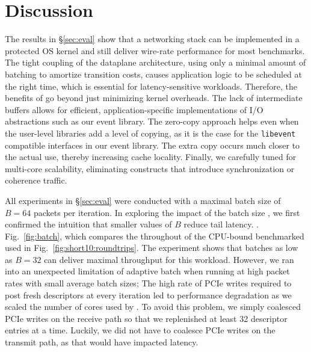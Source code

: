 
\section{Discussion}
\label{sec:disc}


 The results in \S\ref{sec:eval}
show that a networking stack can be implemented in a protected OS
kernel and still deliver wire-rate performance for most benchmarks.
The tight coupling of the dataplane architecture, using only a minimal
amount of batching to amortize transition costs, causes application
logic to be scheduled at the right time, which is essential for
latency-sensitive workloads.  Therefore, the benefits of \ix go beyond
just minimizing kernel overheads. The lack of intermediate buffers
allows for efficient, application-specific implementations of I/O
abstractions such as our event library. The zero-copy approach helps
even when the user-level libraries add a level of copying, as it is
the case for the \texttt{libevent} compatible interfaces in our event
library.  The extra copy occurs much closer to the actual use, thereby
increasing cache locality.  Finally, we carefully tuned \ix for
multi-core scalability, eliminating constructs that introduce
synchronization or coherence traffic.



 All experiments in
\S\ref{sec:eval} were conducted with a maximal batch size of $B=64$
packets per iteration. In exploring the impact of the batch size , we
first confirmed the intuition that smaller values of $B$ reduce tail
latency. .  Fig.~\ref{fig:batch}, which compares the throughout of the
CPU-bound benchmarked used in Fig.~\ref{fig:short10:roundtrips}. The
experiment shows that batches as low as $B=32$ can deliver maximal
throughput for this workload.  However, we ran into an unexpected
limitation of adaptive batch when running \ix at high packet rates
with small average batch sizes; The high rate of PCIe writes required
to post fresh descriptors at every iteration led to performance
degradation as we scaled the number of cores used by \ix.  To avoid
this problem, we simply coalesced PCIe writes on the receive path so
that we replenished at least 32 descriptor entries at a time.
Luckily, we did not have to coalesce PCIe writes on the transmit path,
as that would have impacted latency.


